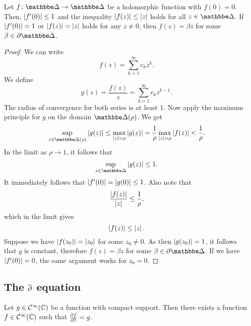 \begin{izrek}
Let $f \colon \dsk \to \dsk$ be a holomorphic function with
$f(0) = 0$. Then, $\left\lvert f'(0)\right\rvert \leq 1$ and the inequality
$\left\lvert f(z)\right\rvert \leq \left\lvert z\right\rvert$ holds for all $z \in \dsk$. If
$\left\lvert f'(0)\right\rvert = 1$ or $\left\lvert f(z)\right\rvert = \left\lvert z\right\rvert$ holds for any
$z \ne 0$, then $f(z) = \beta z$ for some
$\beta \in \partial \dsk$.
\end{izrek}

\begin{proof}
We can write
\[
f(z) = \sum_{k=1}^\infty c_k z^k.
\]
We define
\[
g(z) = \frac{f(z)}{z} = \sum_{k=1}^\infty c_k z^{k-1}.
\]
The radius of convergence for both series is at least $1$. Now
apply the maximum principle for $g$ on the domain $\dsk(\rho)$. We
get
\[
\sup_{z \in \dsk(\rho)} \abs{g(z)} \leq
\max_{\abs{z} = \rho} \abs{g(z)} =
\frac{1}{\rho} \max_{\abs{z} = \rho} \abs{f(z)} <
\frac{1}{\rho}.
\]
In the limit as $\rho \to 1$, it follows that
\[
\sup_{z \in \dsk} \abs{g(z)} \leq 1.
\]
It immediately follows that $\left\lvert f'(0)\right\rvert = \left\lvert g(0)\right\rvert \leq 1$. Also
note that
\[
\frac{\left\lvert f(z)\right\rvert}{\left\lvert z\right\rvert} \leq \frac{1}{\rho},
\]
which in the limit gives
\[
\left\lvert f(z)\right\rvert \leq \left\lvert z\right\rvert.
\]
Suppose we have $\left\lvert f(z_0)\right\rvert = \left\lvert z_0\right\rvert$ for some $z_0 \ne 0$. As
then $\left\lvert g(z_0)\right\rvert = 1$, it follows that $g$ is constant, therefore
$f(z) = \beta z$ for some $\beta \in \partial \dsk$. If we have
$\left\lvert f'(0)\right\rvert = 0$, the same argument works for $z_0 = 0$.
\end{proof}

\newpage

\subsection{The \texorpdfstring{$\overline{\partial}$}{d} equation}

\begin{lema}
\label{hol:lm:bound_diff}
Let $g \in \mathcal{C}^\infty(\mathbb{C})$ be a function with compact
support. Then there exists a function
$f \in \mathcal{C}^\infty(\mathbb{C})$ such that $\frac{\partial f}{\partial \overline{z}} = g$.
\end{lema}

